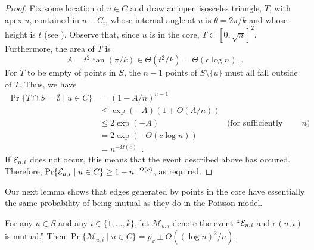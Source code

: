 \documentclass{patmorin}
\begin{document}
\begin{proof}
  Fix some location of $u\in C$ and draw an open isosceles triangle,
  $T$, with apex $u$, contained in $u+C_i$, whose internal angle at
  $u$ is $\theta=2\pi/k$ and whose height is $t$ (see ).
  Observe that, since $u$ is in the core, $T\subset [0,\sqrt{n}]^2$.
  Furthermore, the area of $T$
  is 
  \[ 
     A = t^2\tan(\pi/k)\in \Theta(t^2/k) = \Theta(c\log n) \enspace .
  \]
  For $T$ to be empty of points in $S$, the $n-1$ points of $S\setminus\{u\}$
  must all fall outside of $T$.  Thus, we have
  \begin{align*}
    \Pr\{T\cap S=\emptyset\mid u\in C\} 
       & = (1-A/n)^{n-1} \\
       & \le \exp(-A)(1+O(A/n)) \\
       & \le 2\exp(-A) & \text{(for sufficiently large $n$)}\\
       & = 2\exp(-\Theta(c\log n)) \\
       & = n^{-\Omega(c)} \enspace .
  \end{align*}
  If $\mathcal{E}_{u,i}$ does not occur, this means that the event described above
  has occured.  Therefore, $\Pr\{\mathcal{E}_{u,i}\mid u\in C\}\ge 1-n^{-\Omega(c)}$,
  as required.
\end{proof}

\newcommand{\mui}{\mathcal{M}_{u,i}}

Our next lemma shows that edges generated by points in the core have
essentially the same probability of being mutual as they do in the
Poisson model.

\begin{lem}
    For any $u\in S$ and any $i\in\{1,\ldots,k\}$, let $\mui$ denote the
    event ``$\mathcal{E}_{u,i}$ and $e(u,i)$ is mutual.'' Then $\Pr\{\mui\mid u\in C\}
    = p_k\pm O((\log n)^2/n)$.
\end{lem}
\end{document}

